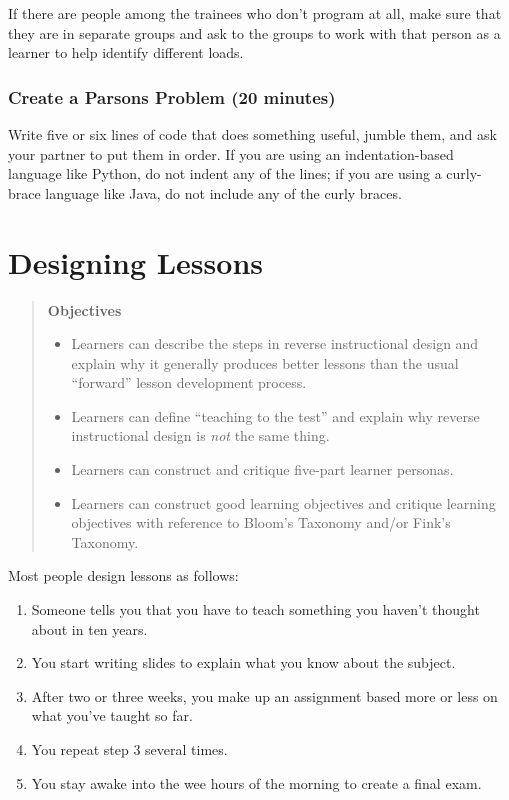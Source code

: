 \documentclass[10pt,statementpaper]{memoir}
\providecommand{\tightlist}{%
  \setlength{\itemsep}{0pt}\setlength{\parskip}{0pt}}
\begin{document}
If there are people among the trainees who don't program at all, make
sure that they are in separate groups and ask to the groups to work with
that person as a learner to help identify different loads.

\subsection{Create a Parsons Problem (20
minutes)}\label{create-a-parsons-problem-20-minutes}

Write five or six lines of code that does something useful, jumble them,
and ask your partner to put them in order. If you are using an
indentation-based language like Python, do not indent any of the lines;
if you are using a curly-brace language like Java, do not include any of
the curly braces.

\chapter{Designing Lessons}\label{designing-lessons}

\begin{quote}
\textbf{Objectives}

\begin{itemize}
\tightlist
\item
  Learners can describe the steps in reverse instructional design and
  explain why it generally produces better lessons than the usual
  ``forward'' lesson development process.
\item
  Learners can define ``teaching to the test'' and explain why reverse
  instructional design is \emph{not} the same thing.
\item
  Learners can construct and critique five-part learner personas.
\item
  Learners can construct good learning objectives and critique learning
  objectives with reference to Bloom's Taxonomy and/or Fink's Taxonomy.
\end{itemize}
\end{quote}

Most people design lessons as follows:

\begin{enumerate}
\def\labelenumi{\arabic{enumi}.}
\item
  Someone tells you that you have to teach something you haven't thought
  about in ten years.
\item
  You start writing slides to explain what you know about the subject.
\item
  After two or three weeks, you make up an assignment based more or less
  on what you've taught so far.
\item
  You repeat step 3 several times.
\item
  You stay awake into the wee hours of the morning to create a final
  exam.
\end{enumerate}
\end{document}
